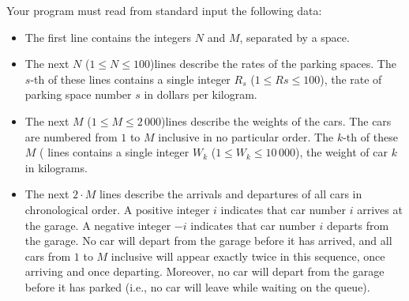 Your program must read from standard input the following data:
\begin{itemize}
\item The first line contains the integers $N$ and $M$, separated by a space.
\item The next $N$ ($1 \le N \le 100$)lines describe the rates of the parking spaces. The $s$-th of these lines contains a single integer $R_s$ ($1 \le Rs \le 100$), the rate of parking space number $s$ in dollars per kilogram.
\item The next $M$ ($1 \le M \le 2\,000$)lines describe the weights of the cars. The cars are numbered from $1$ to $M$ inclusive in no particular order. The $k$-th of these $M$ ( lines contains a single integer $W_k$ ($1 \le W_k \le 10\,000$), the weight of car $k$ in kilograms.
\item The next $2\cdot M$ lines describe the arrivals and departures of all cars in chronological order. A positive integer $i$ indicates that car number $i$ arrives at the garage. A negative integer $-i$ indicates that car number $i$ departs from the garage. No car will depart from the garage before it has arrived, and all cars from $1$ to $M$ inclusive will appear exactly twice in this sequence, once arriving and once departing. Moreover, no car will depart from the garage before it has parked (i.e., no car will leave while waiting on the queue). 
\end{itemize}